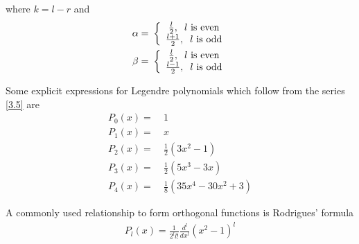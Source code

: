 \documentclass[a4paper]{article}
\numberwithin{equation}{section}
\begin{document}
where $k=l-r$ and 
\begin{align}
\alpha  =&\ \left\{ {\begin{array}{*{20}{c}}
{\frac{l}{2},\hspace{0.2cm} l\mbox{ is even}}\\
{\frac{{l + 1}}{2},\hspace{0.2cm} l\mbox{ is odd}}
\end{array}} \right.\\
\beta  =&\ \left\{ {\begin{array}{*{20}{c}}
{\frac{l}{2},\hspace{0.2cm} l\mbox{ is even}}\\
{\frac{{l - 1}}{2},\hspace{0.2cm} l\mbox{ is odd}}
\end{array}} \right.
\end{align}

Some explicit expressions for Legendre polynomials which follow from the series \eqref{3.5} are
\begin{align}
{P_0}\left( x \right) =&\ 1\\
{P_1}\left( x \right) =&\ x\\
{P_2}\left( x \right) =&\ \frac{1}{2}\left( {3{x^2} - 1} \right)\\
{P_3}\left( x \right) =&\ \frac{1}{2}\left( {5{x^3} - 3x} \right)\\
{P_4}\left( x \right) =&\ \frac{1}{8}\left( {35{x^4} - 30{x^2} + 3} \right)
\end{align}

A commonly used relationship to form orthogonal functions is Rodrigues' formula
\begin{align}
{P_l}\left( x \right) = \frac{1}{{{2^l}l!}}\frac{{{d^l}}}{{d{x^l}}}{\left( {{x^2} - 1} \right)^l}
\end{align}
\end{document}
